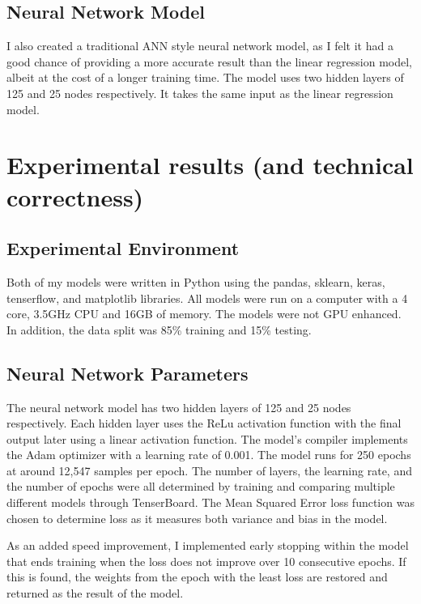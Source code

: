 \documentclass[compsoc]{IEEEtran}
\begin{document}
\subsection{Neural Network Model}
I also created a traditional ANN style neural network model, as I felt it had a good chance of providing a more accurate result than the linear regression model, albeit at the cost of a longer training time. The model uses two hidden layers of 125 and 25 nodes respectively. It takes the same input as the linear regression model.

\section{Experimental results (and technical correctness)}
\subsection{Experimental Environment}
Both of my models were written in Python using the pandas, sklearn, keras, tenserflow, and matplotlib libraries. All models were run on a computer with a 4 core, 3.5GHz CPU and 16GB of memory. The models were not GPU enhanced. In addition, the data split was 85\% training and 15\% testing.
\subsection{Neural Network Parameters}
The neural network model has two hidden layers of 125 and 25 nodes respectively. Each hidden layer uses the ReLu activation function with the final output later using a linear activation function. The model's compiler implements the Adam optimizer with a learning rate of 0.001. The model runs for 250 epochs at around 12,547 samples per epoch. The number of layers, the learning rate, and the number of epochs were all determined by training and comparing multiple different models through TenserBoard. The Mean Squared Error loss function was chosen to determine loss as it measures both variance and bias in the model.

As an added speed improvement, I implemented early stopping within the model that ends training when the loss does not improve over 10 consecutive epochs. If this is found, the weights from the epoch with the least loss are restored and returned as the result of the model.
\end{document}
